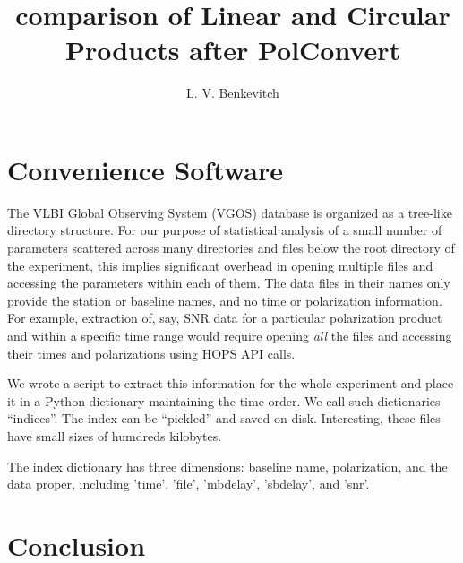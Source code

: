 \documentclass[letterpaper,twoside,12pt]{article}
\title{comparison of Linear and Circular Products after PolConvert}
\author[1]{L. V. Benkevitch}
\affil[1]{\small MIT Haystack observatory, Westford, MA 01886, USA.}
\begin{document}
\maketitle

\begin{abstract}

\end{abstract}


\tableofcontents

\section{Convenience Software}

The VLBI Global Observing System (VGOS) database is organized as a tree-like directory structure. For our purpose of statistical analysis of a small number of parameters scattered across many directories and files below the root directory of the experiment, this implies significant overhead in opening multiple files and accessing the parameters within each of them. The data files in their names only provide the station or baseline names, and no time or polarization information. For example, extraction of, say, SNR data for a particular polarization product and within a specific time range would require opening \emph{all} the files and accessing their times and polarizations using HOPS API calls.

We wrote a script to extract this information for the whole experiment and place it in a Python dictionary maintaining the time order. We call such dictionaries ``indices''. The index can be ``pickled'' and saved on disk. Interesting, these files have small sizes of humdreds kilobytes. 
 
The index dictionary has three dimensions: baseline name, polarization, and the data proper, including 'time', 'file', 'mbdelay', 'sbdelay', and 'snr'.

\section{Conclusion}


\newpage
\end{document}
